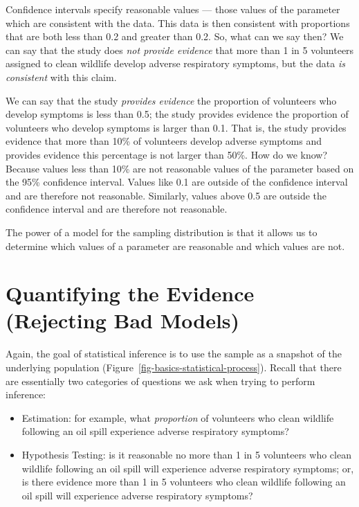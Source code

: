 \documentclass[
  letterpaper,
  DIV=11,
  numbers=noendperiod]{scrreprt}
\providecommand{\tightlist}{%
  \setlength{\itemsep}{0pt}\setlength{\parskip}{0pt}}\usepackage{longtable,booktabs,array}
\theoremstyle{plain}
\theoremstyle{definition}
\theoremstyle{definition}
\theoremstyle{remark}
\begin{document}
Confidence intervals specify reasonable values --- those values of the
parameter which are consistent with the data. This data is then
consistent with proportions that are both less than 0.2 and greater than
0.2. So, what can we say then? We can say that the study does \emph{not
provide evidence} that more than 1 in 5 volunteers assigned to clean
wildlife develop adverse respiratory symptoms, but the data \emph{is
consistent} with this claim.

We can say that the study \emph{provides evidence} the proportion of
volunteers who develop symptoms is less than 0.5; the study provides
evidence the proportion of volunteers who develop symptoms is larger
than 0.1. That is, the study provides evidence that more than 10\% of
volunteers develop adverse symptoms and provides evidence this
percentage is not larger than 50\%. How do we know? Because values less
than 10\% are not reasonable values of the parameter based on the 95\%
confidence interval. Values like 0.1 are outside of the confidence
interval and are therefore not reasonable. Similarly, values above 0.5
are outside the confidence interval and are therefore not reasonable.

The power of a model for the sampling distribution is that it allows us
to determine which values of a parameter are reasonable and which values
are not.

\hypertarget{sec-nulldistns}{%
\chapter{Quantifying the Evidence (Rejecting Bad
Models)}\label{sec-nulldistns}}

Again, the goal of statistical inference is to use the sample as a
snapshot of the underlying population
(Figure~\ref{fig-basics-statistical-process}). Recall that there are
essentially two categories of questions we ask when trying to perform
inference:

\begin{itemize}
\tightlist
\item
  Estimation: for example, what \emph{proportion} of volunteers who
  clean wildlife following an oil spill experience adverse respiratory
  symptoms?
\item
  Hypothesis Testing: is it reasonable no more than 1 in 5 volunteers
  who clean wildlife following an oil spill will experience adverse
  respiratory symptoms; or, is there evidence more than 1 in 5
  volunteers who clean wildlife following an oil spill will experience
  adverse respiratory symptoms?
\end{itemize}
\end{document}
